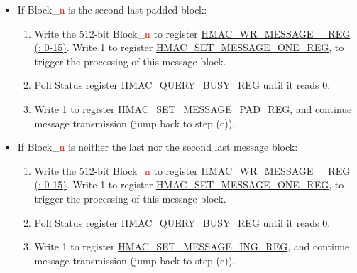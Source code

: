 \documentclass[main\_\_EN.tex]{subfiles}
\begin{document}
\begin{enumerate}
\begin{enumerate}
\begin{itemize}
\begin{enumerate}
                \item Poll Status register \hyperref[regdesc:HMACQUERYBUSYREG]{HMAC\_QUERY\_BUSY\_REG} until it reads 0.
                \item Message transmission finished automatically.
            \end{enumerate}
            \item If Block\_\textcolor{red}{n} is the second last padded block:
            \begin{enumerate}
                \item Write the 512-bit Block\_\textcolor{red}{n} to register \hyperref[regdesc:HMACWRMESSAGENREG]
                {HMAC\_WR\_MESSAGE\_\_REG (: 0-15)}. Write 1 to register \hyperref[regdesc:HMACSETMESSAGEONEREG]{HMAC\_SET\_MESSAGE\_ONE\_REG}, to trigger the processing of this message block.
                \item Poll Status register \hyperref[regdesc:HMACQUERYBUSYREG]{HMAC\_QUERY\_BUSY\_REG} until it reads 0.
                \item Write 1 to register \hyperref[regdesc:HMACSETMESSAGEPADREG]{HMAC\_SET\_MESSAGE\_PAD\_REG}, and continue message transmission (jump back to step (c)).
            \end{enumerate}


            \item If Block\_\textcolor{red}{n} is neither the last nor the second last message block:
            \begin{enumerate}
                \item Write the 512-bit Block\_\textcolor{red}{n} to register \hyperref[regdesc:HMACWRMESSAGENREG]
                {HMAC\_WR\_MESSAGE\_\_REG (: 0-15)}. Write 1 to register \hyperref[regdesc:HMACSETMESSAGEONEREG]{HMAC\_SET\_MESSAGE\_ONE\_REG}, to trigger the processing of this message block.
                \item Poll Status register \hyperref[regdesc:HMACQUERYBUSYREG]{HMAC\_QUERY\_BUSY\_REG} until it reads 0.
                \item Write 1 to register \hyperref[regdesc:HMACSETMESSAGEINGREG]{HMAC\_SET\_MESSAGE\_ING\_REG}, and continue message transmission (jump back to step (c)).
            \end{enumerate}
        \end{itemize}
    \end{enumerate}


\end{enumerate}
\end{document}

